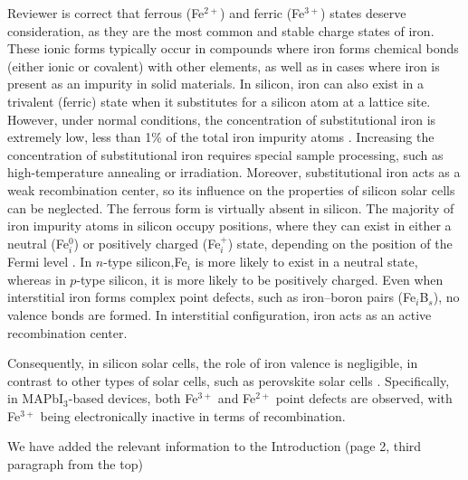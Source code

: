 \documentclass[a4paper,fleqn]{cas-sc}
\begin{document}
Reviewer is correct that ferrous (Fe$^{2+}$) and ferric (Fe$^{3+}$) states deserve consideration, 
as they are the most common and stable charge states of iron. 
These ionic forms typically occur in compounds where iron forms chemical bonds (either ionic or covalent) with other elements, 
as well as in cases where iron is present as an impurity in solid materials.
In silicon, iron can also exist in a trivalent (ferric) state when it substitutes for a silicon atom at a lattice site. 
However, under normal conditions, the concentration of substitutional iron is extremely low, less than 1\% of the total iron impurity atoms \cite{Wright2016}. 
Increasing the concentration of substitutional iron requires special sample processing, such as high-temperature annealing or irradiation.
Moreover, substitutional iron acts as a weak recombination center, 
so its influence on the properties of silicon solar cells can be neglected. 
The ferrous form is virtually absent in silicon.
The majority of iron impurity atoms in silicon occupy positions, 
where they can exist in either a neutral (Fe$_i^0$) or positively charged (Fe$_i^+$) state, 
depending on the position of the Fermi level \cite{Istratov1999}. 
In $n$-type silicon,Fe$_i$ is more likely to exist in a neutral state, 
whereas in $p$-type silicon, it is more likely to be positively charged. 
Even when interstitial iron forms complex point defects, such as iron–boron pairs (Fe$_i$B$_s$), no valence bonds are formed.
In interstitial configuration, iron acts as an active recombination center.

Consequently, in silicon solar cells, the role of iron valence is negligible, 
in contrast to other types of solar cells, such as perovskite solar cells \cite{Poindexter2017}. 
Specifically, in MAPbI$_3$-based devices, both Fe$^{3+}$ and Fe$^{2+}$  point defects are observed, 
with Fe$^{3+}$ being electronically inactive in terms of recombination.

We have added the relevant information to the Introduction (page 2, third paragraph from the top)
\end{document}
